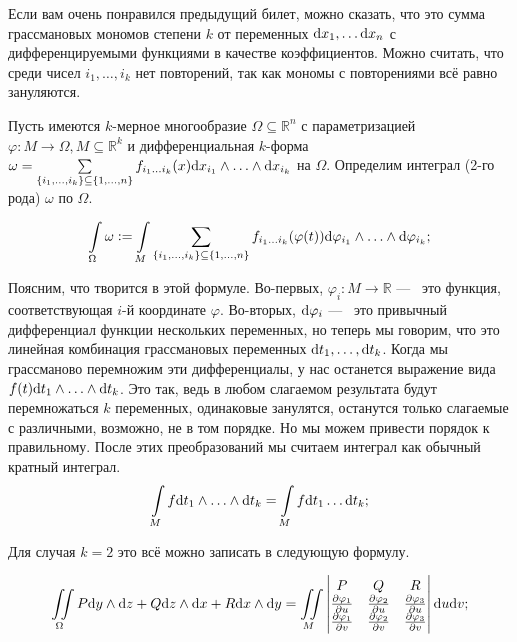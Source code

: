 \documentclass{article}
\begin{document}
	Если вам очень понравился предыдущий билет, можно сказать, что это сумма грассмановых мономов степени $k$ от переменных $\mathrm{d} x_1, \ldots \mathrm{d} x_n$ с дифференцируемыми функциями в качестве коэффициентов. Можно считать, что среди чисел $i_1, \ldots, i_k$ нет повторений, так как мономы с повторениями всё равно зануляются.

	Пусть имеются $k$-мерное многообразие $\Omega \subseteq \mathbb{R}^n$ с параметризацией $\varphi: M \to \Omega, M \subseteq \mathbb{R}^k$ и дифференциальная $k$-форма $\omega = \sum\limits_{\{i_1, \ldots, i_k\} \subseteq \{1, \ldots, n\}} f_{i_1 \ldots i_k}(x)\mathrm{d} x_{i_1} \land \ldots \land \mathrm{d} x_{i_k}$ на $\Omega$. Определим интеграл (2-го рода) $\omega$ по $\Omega$.

	\[ \int\limits_\Omega \omega := \int\limits_M \sum_{\{i_1, \ldots, i_k\} \subseteq \{1, \ldots, n\}} f_{i_1 \ldots i_k} (\varphi(t)) \mathrm{d} \varphi_{i_1} \land \ldots \land \mathrm{d} \varphi_{i_k}; \]

	Поясним, что творится в этой формуле. Во-первых, $\varphi_i : M \to \mathbb{R}$ ---~ это функция, соответствующая $i$-й координате $\varphi$. Во-вторых, $\mathrm{d} \varphi_i$ ---~ это привычный дифференциал функции нескольких переменных, но теперь мы говорим, что это линейная комбинация грассмановых переменных $\mathrm{d} t_1, \ldots, \mathrm{d} t_k$. Когда мы грассманово перемножим эти дифференциалы, у нас останется выражение вида $f(t) \mathrm{d} t_1 \land \ldots  \land \mathrm{d} t_k$. Это так, ведь в любом слагаемом результата будут перемножаться $k$ переменных, одинаковые занулятся, останутся только слагаемые с различными, возможно, не в том порядке. Но мы можем привести порядок к правильному. После этих преобразований мы считаем интеграл как обычный кратный интеграл.
\[\int\limits_M f \mathrm{d} t_1 \land \ldots \land \mathrm{d} t_k = \int\limits_M f \mathrm{d} t_1 \ldots \mathrm{d} t_k;  \]  

	Для случая $k = 2$ это всё можно записать в следующую формулу.

	\[\iint\limits_\Omega P\mathrm{d} y \land \mathrm{d} z + Q \mathrm{d} z \land \mathrm{d} x + R \mathrm{d} x \land \mathrm{d} y = \iint\limits_M \begin{vmatrix} P & Q & R \\ \frac{\partial \varphi_1}{\partial u} & \frac{\partial \varphi_2}{\partial u} & \frac{\partial \varphi_3}{\partial u} \\ \frac{\partial \varphi_1}{\partial v} & \frac{\partial \varphi_2}{\partial v} & \frac{\partial \varphi_3}{\partial v} \end{vmatrix} \mathrm{d} u \mathrm{d} v;\]
\end{document}
